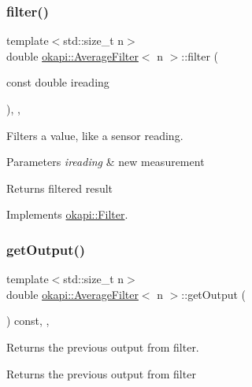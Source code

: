 \subsubsection{\texorpdfstring{filter()}{filter()}}
{\footnotesize\ttfamily template$<$std\+::size\+\_\+t n$>$ \\
double \mbox{\hyperlink{classokapi_1_1AverageFilter}{okapi\+::\+Average\+Filter}}$<$ n $>$\+::filter (\begin{DoxyParamCaption}\item[{const double}]{ireading }\end{DoxyParamCaption})\hspace{0.3cm}{\ttfamily [inline]}, {\ttfamily [override]}, {\ttfamily [virtual]}}

Filters a value, like a sensor reading.


\begin{DoxyParams}{Parameters}
{\em ireading} & new measurement \\
\hline
\end{DoxyParams}
\begin{DoxyReturn}{Returns}
filtered result 
\end{DoxyReturn}


Implements \mbox{\hyperlink{classokapi_1_1Filter_a7c2ea0b64b37b688900189856d58da15}{okapi\+::\+Filter}}.

\mbox{\label{classokapi_1_1AverageFilter_a2ee104dfc880e779079dc8e1e242a44b}} 
\subsubsection{\texorpdfstring{getOutput()}{getOutput()}}
{\footnotesize\ttfamily template$<$std\+::size\+\_\+t n$>$ \\
double \mbox{\hyperlink{classokapi_1_1AverageFilter}{okapi\+::\+Average\+Filter}}$<$ n $>$\+::get\+Output (\begin{DoxyParamCaption}{ }\end{DoxyParamCaption}) const\hspace{0.3cm}{\ttfamily [inline]}, {\ttfamily [override]}, {\ttfamily [virtual]}}

Returns the previous output from filter.

\begin{DoxyReturn}{Returns}
the previous output from filter 
\end{DoxyReturn}


